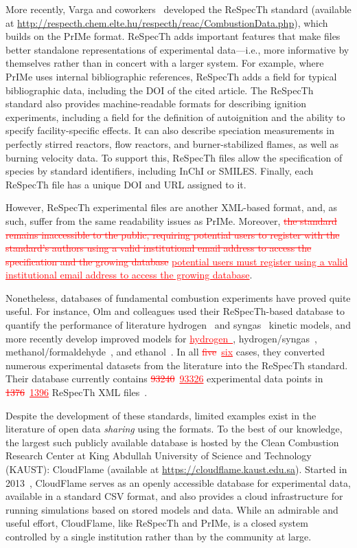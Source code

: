 \documentclass[12pt]{ijck}
\newcommand{\addtwo}[1]{{\sloppy\textcolor{red}{\uline{#1}}}}  %
\newcommand{\deletetwo}[1]{\sloppy\textcolor{red}{\sout{#1}}}    %
\begin{document}
More recently, Varga and coworkers~\autocite{Varga2015a,Varga2017} developed the
ReSpecTh standard (available at
\url{http://respecth.chem.elte.hu/respecth/reac/CombustionData.php}),
which builds on the PrIMe format. ReSpecTh adds important
features that make files better standalone representations of experimental
data---i.e., more informative by themselves rather than in concert with a larger
system. For example, where PrIMe uses internal bibliographic references,
ReSpecTh adds a field for typical bibliographic data, including the DOI of
the cited article. The ReSpecTh standard also
provides machine-readable formats for describing ignition experiments, including
a field for the definition of autoignition and the ability to specify
facility-specific effects. It can also describe speciation measurements in
perfectly stirred reactors, flow reactors, and burner-stabilized flames, as well as
burning velocity data. To support this, ReSpecTh files allow the specification of species by
standard identifiers, including InChI or SMILES. Finally, each ReSpecTh file
has a unique DOI and URL assigned to it.

However, ReSpecTh experimental files are another
XML-based format, and, as such, suffer from the same readability issues as PrIMe.
Moreover, \deletetwo{the standard remains inaccessible to the public, requiring potential users
to register with the standard's authors using a valid institutional email address
to access the specification and the growing database}
\addtwo{potential users must register using a valid institutional email address
to access the growing database}.

Nonetheless, databases of fundamental combustion experiments
have proved quite useful. For instance, Olm and colleagues used their
ReSpecTh-based database to quantify the performance of literature
hydrogen~\autocite{Olm:2014gn} and syngas~\autocite{Olm:2015ch} kinetic models,
and more recently develop improved models for \addtwo{hydrogen~\autocite{Varga:2015hy}},
hydrogen\slash syngas~\autocite{Varga:2016gj},
methanol\slash formaldehyde~\autocite{Olm:2017a},
and ethanol~\autocite{Olm:2016et}. In all \deletetwo{five}~\addtwo{six} cases, they converted numerous
experimental datasets from the literature into the ReSpecTh standard.
Their database currently contains \deletetwo{\num{93240}}~\addtwo{\num{93326}}
experimental data points in \deletetwo{1376}~\addtwo{1396}
ReSpecTh XML files~\autocite{respecth}.

Despite the development of these standards, limited examples exist in the
literature of open data \emph{sharing} using the formats. To the best
of our knowledge, the largest such publicly available database is hosted by
the Clean Combustion Research Center at King Abdullah University of Science and
Technology (KAUST): CloudFlame (available at \url{https://cloudflame.kaust.edu.sa}).
Started in 2013~\autocite{Goteng:2013cf,Goteng:2014,ReynoChiasson:2015}, CloudFlame
serves as an openly accessible database for experimental data, available in a standard
CSV format, and also provides a cloud infrastructure for running simulations
based on stored models and data. While an admirable and useful effort,
CloudFlame, like ReSpecTh and PrIMe, is a closed system controlled by a single
institution rather than by the community at large.
\end{document}
